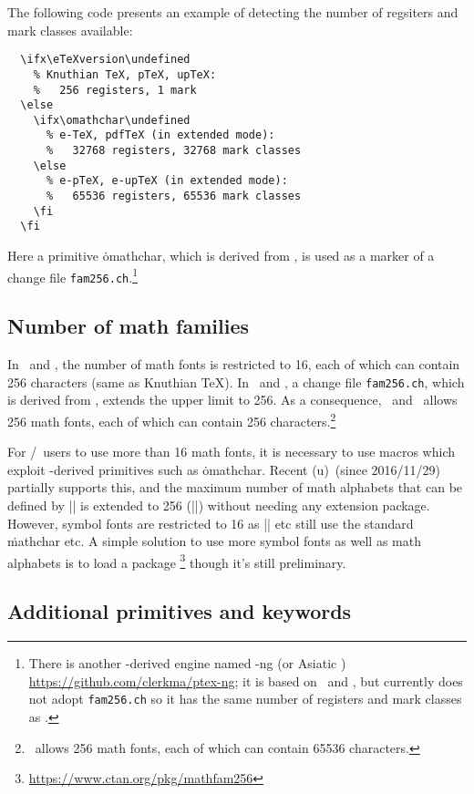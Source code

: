 \documentclass[a4paper,11pt,dvipdfmx]{article}
\def\code#1{\texttt{#1}}
\begin{document}
The following code presents an example of detecting the number of
regsiters and mark classes available:
\begin{verbatim}
  \ifx\eTeXversion\undefined
    % Knuthian TeX, pTeX, upTeX:
    %   256 registers, 1 mark
  \else
    \ifx\omathchar\undefined
      % e-TeX, pdfTeX (in extended mode):
      %   32768 registers, 32768 mark classes
    \else
      % e-pTeX, e-upTeX (in extended mode):
      %   65536 registers, 65536 mark classes
    \fi
  \fi
\end{verbatim}
Here a primitive \.{omathchar}, which is derived from \OMEGA, is used
as a marker of a change file \code{fam256.ch}.\footnote{%
There is another \pTeX-derived engine named \pTeX-ng (or Asiatic \pTeX)
\url{https://github.com/clerkma/ptex-ng}; it is based on
\eTeX\ and \upTeX, but currently does not adopt \code{fam256.ch}
so it has the same number of registers and mark classes as \eTeX.}

\subsection{Number of math families}

In \pTeX\ and \upTeX,
the number of math fonts is restricted to 16,
each of which can contain 256 characters (same as Knuthian \TeX).
In \epTeX\ and \eupTeX, a change file \code{fam256.ch},
which is derived from \OMEGA, extends the upper limit to 256.
As a consequence, \epTeX\ and \eupTeX\ allows 256 math fonts,
each of which can contain 256 characters.\footnote{\OMEGA\ allows
256 math fonts, each of which can contain 65536 characters.}

For \pLaTeX/\upLaTeX\ users to use more than 16 math fonts,
it is necessary to use macros which exploit \OMEGA-derived primitives
such as \.{omathchar}.
Recent (u)\pLaTeX\ (since 2016/11/29) partially supports this,
and the maximum number of math alphabets that can be defined by
|\DeclareMathAlphabet| is extended to 256 (|\e@mathgroup@top|)
without needing any extension package.
However, symbol fonts are restricted to 16 as
|\DeclareMathSymbol| etc still use the standard \.{mathchar} etc.
A simple solution to use more symbol fonts as well as math alphabets
is to load a package \footnote{%
\url{https://www.ctan.org/pkg/mathfam256}} though it's still preliminary.

\subsection{Additional primitives and keywords}
\end{document}
